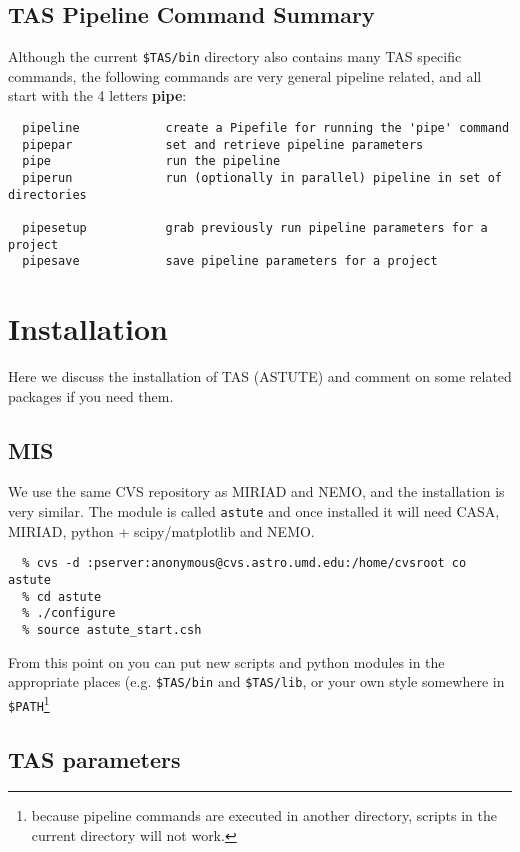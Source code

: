 \documentclass[preprint]{aastex} %
\begin{document}
\section{TAS Pipeline Command Summary} 

Although the current {\tt \$TAS/bin} directory also contains
many TAS specific commands, the following commands are very general
pipeline related, and all start with the 4 letters {\bf pipe}:

\footnotesize
\begin{verbatim}
  pipeline            create a Pipefile for running the 'pipe' command
  pipepar             set and retrieve pipeline parameters
  pipe                run the pipeline
  piperun             run (optionally in parallel) pipeline in set of directories

  pipesetup           grab previously run pipeline parameters for a project
  pipesave            save pipeline parameters for a project
\end{verbatim}
\normalsize   

\chapter{Installation}

Here we discuss the installation of TAS (ASTUTE) and 
comment on some related packages if you need them.

\section{MIS}

We use the same CVS repository as MIRIAD and NEMO, and the
installation is very similar. The module is called {\tt astute} and
once installed it will need CASA, MIRIAD, python + scipy/matplotlib and NEMO.

\footnotesize
\begin{verbatim}
  % cvs -d :pserver:anonymous@cvs.astro.umd.edu:/home/cvsroot co astute
  % cd astute
  % ./configure
  % source astute_start.csh
\end{verbatim}
\normalsize

From this point on you can put new scripts and python modules in
the appropriate places (e.g. {\tt \$TAS/bin} and {\tt \$TAS/lib}, 
or your own style somewhere 
in {\tt \$PATH}\footnote{because pipeline 
commands are executed in another directory,
scripts in the current directory will not work.}

\section{TAS parameters}
\end{document}
